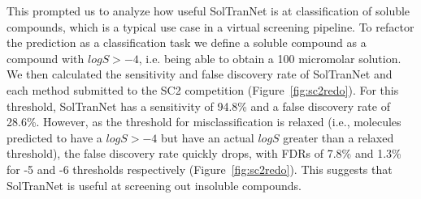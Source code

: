 \documentclass[journal=jcim,manuscript=applicationnotes]{achemso} %
\begin{document}
This prompted us to analyze how useful SolTranNet is at classification of soluble compounds, which is a typical use case in a virtual screening pipeline.
To refactor the prediction as a classification task we define a soluble compound as a compound with $logS > -4$, i.e. being able to obtain a 100 micromolar solution.
We then calculated the sensitivity and false discovery rate of SolTranNet and each method submitted to the SC2 competition (Figure~\ref{fig:sc2redo}).
For this threshold, SolTranNet has a sensitivity of 94.8\% and a false discovery rate of 28.6\%.
However, as the threshold for misclassification is relaxed (i.e., molecules predicted to have a $logS > -4$ but have an actual $logS$ greater than a relaxed threshold), the false discovery rate quickly drops, with FDRs of 7.8\% and 1.3\% for -5 and -6 thresholds respectively (Figure~\ref{fig:sc2redo}).
This suggests that SolTranNet is useful at screening out insoluble compounds.
\end{document}
